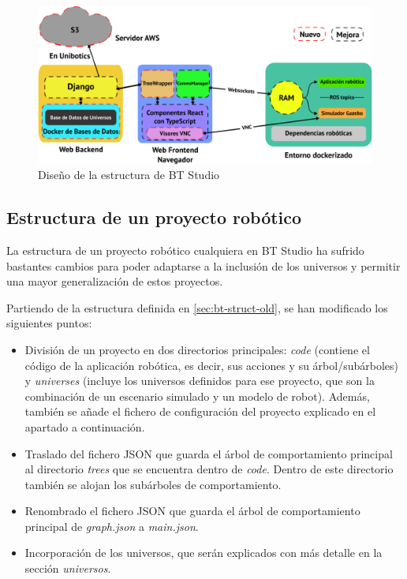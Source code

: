 \begin{figure}[H]
    \centering
    \includegraphics[width=\textwidth]{figures/bt-avances/bt-structure.png}
    \caption{Diseño de la estructura de BT Studio}
    \label{fig:bt-new-struct}
\end{figure}

\subsection{Estructura de un proyecto robótico}

La estructura de un proyecto robótico cualquiera en BT Studio ha sufrido bastantes cambios para poder adaptarse a la inclusión de los universos y permitir una mayor generalización de estos proyectos.

Partiendo de la estructura definida en \ref{sec:bt-struct-old}, se han modificado los siguientes puntos:

\begin{itemize}
    \item División de un proyecto en dos directorios principales: \textit{code} (contiene el código de la aplicación robótica, es decir, sus acciones y su árbol/subárboles) y \textit{universes} (incluye los universos definidos para ese proyecto, que son la combinación de un escenario simulado y un modelo de robot). Además, también se añade el fichero de configuración del proyecto explicado en el apartado a continuación.
    \item Traslado del fichero JSON que guarda el árbol de comportamiento principal al directorio \textit{trees} que se encuentra dentro de \textit{code}. Dentro de este directorio también se alojan los subárboles de comportamiento.
    \item Renombrado el fichero JSON que guarda el árbol de comportamiento principal de \textit{graph.json} a \textit{main.json}.
    \item Incorporación de los universos, que serán explicados con más detalle en la sección \textit{universos}.
\end{itemize}

